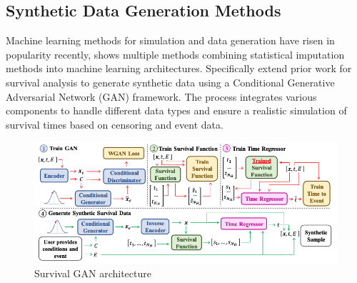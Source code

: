 \subsection{Synthetic Data Generation Methods}
Machine learning methods for simulation and data generation have risen in popularity recently, \parencite{norcliffe_survivalgan_2023} shows multiple methods combining statistical imputation methods into machine learning architectures. Specifically \parencite{norcliffe_survivalgan_2023} extend prior work for survival analysis to generate synthetic data using a Conditional Generative Adversarial Network (GAN) framework. The process integrates various components to handle different data types and ensure a realistic simulation of survival times based on censoring and event data.

\begin{figure}[h]
    \centering
    \includegraphics[scale=0.49]{Figures/GAN_ARCH.png}
    \caption{\parencite{norcliffe_survivalgan_2023} Survival GAN architecture}
\end{figure}
\pagebreak

